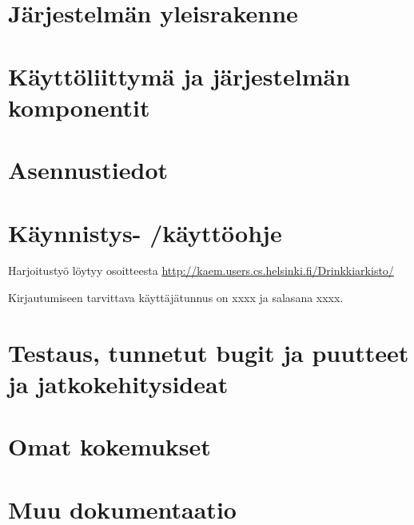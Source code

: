 \documentclass[a4paper]{article}
\begin{document}
\section{Järjestelmän yleisrakenne}
\section{Käyttöliittymä ja järjestelmän komponentit}
\section{Asennustiedot}
\section{Käynnistys- /käyttöohje}
Harjoitustyö löytyy osoitteesta \url{http://kaem.users.cs.helsinki.fi/Drinkkiarkisto/}


Kirjautumiseen tarvittava käyttäjätunnus on xxxx ja salasana xxxx.
\section{Testaus, tunnetut bugit ja puutteet ja jatkokehitysideat}
\section{Omat kokemukset}
\section{Muu dokumentaatio}
\end{document}
